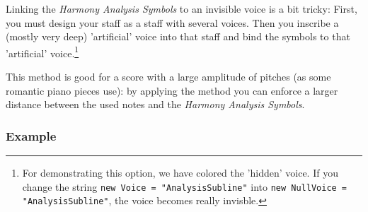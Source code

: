 \documentclass[
  DIV=calc,
  BCOR=5mm,
  12pt,
  headings=small,
  oneside,
  abstract=true,
  toc=bib,
  xcolor=dvipsnames,
  openany,
  ngerman,english]{scrartcl}
\newcommand{\has}[1]{\textit{Harmony Analysis Symbol#1}}
\begin{document}
Linking the \has{s} to an invisible voice is a bit tricky: First, you must
design your staff as a staff with several voices. Then you inscribe a (mostly
very deep) 'artificial' voice into that staff and bind the symbols to that
'artificial' voice.\footnote{For demonstrating this option, we have colored the
'hidden' voice. If you change the string \texttt{new Voice = "AnalysisSubline"}
into \texttt{new NullVoice = "AnalysisSubline"}, the voice becomes really
invisble.}

This method is good for a score with a large amplitude of pitches (as some
romantic piano pieces use): by applying the method you can enforce a larger
distance between the used notes and the \has{s}.

\subsubsection{Example}
\end{document}
